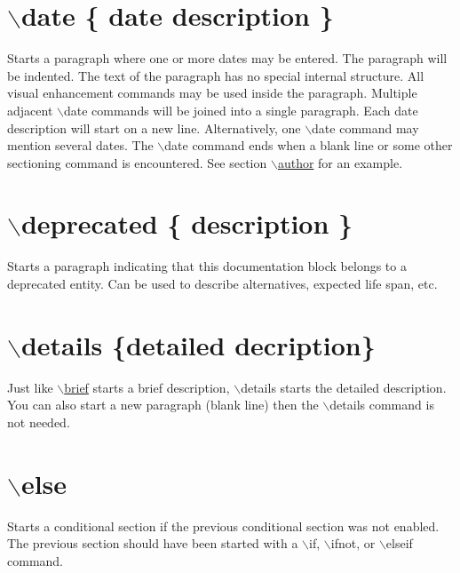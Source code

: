  \hypertarget{commands_cmddate}{}\section{$\backslash$date \{ date description \}}\label{commands_cmddate}
 Starts a paragraph where one or more dates may be entered. The paragraph will be indented. The text of the paragraph has no special internal structure. All visual enhancement commands may be used inside the paragraph. Multiple adjacent $\backslash$date commands will be joined into a single paragraph. Each date description will start on a new line. Alternatively, one $\backslash$date command may mention several dates. The $\backslash$date command ends when a blank line or some other sectioning command is encountered. See section \hyperlink{commands_cmdauthor}{$\backslash$author} for an example.



 \hypertarget{commands_cmddeprecated}{}\section{$\backslash$deprecated \{ description \}}\label{commands_cmddeprecated}
 Starts a paragraph indicating that this documentation block belongs to a deprecated entity. Can be used to describe alternatives, expected life span, etc.



 \hypertarget{commands_cmddetails}{}\section{$\backslash$details \{detailed decription\}}\label{commands_cmddetails}
 Just like \hyperlink{commands_cmdbrief}{$\backslash$brief} starts a brief description, $\backslash$details starts the detailed description. You can also start a new paragraph (blank line) then the $\backslash$details command is not needed.



 \hypertarget{commands_cmdelse}{}\section{$\backslash$else}\label{commands_cmdelse}
 Starts a conditional section if the previous conditional section was not enabled. The previous section should have been started with a {\ttfamily $\backslash$if}, {\ttfamily $\backslash$ifnot}, or {\ttfamily $\backslash$elseif} command.

